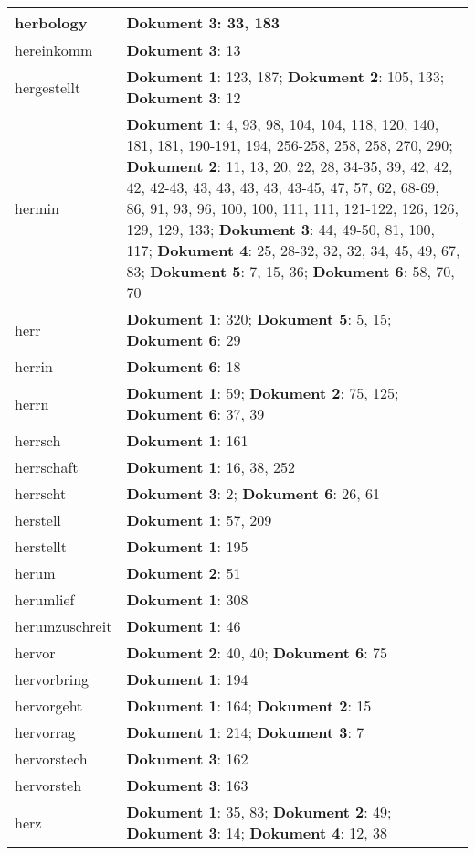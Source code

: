 \documentclass[a5paper]{article}
\begin{document}
\begin{longtable}[l]{|l|p{3in}|}
\hline
herbology & \textbf{Dokument 3}: 33, 183 \\
\hline
hereinkomm & \textbf{Dokument 3}: 13 \\
\hline
hergestellt & \textbf{Dokument 1}: 123, 187; \textbf{Dokument 2}: 105, 133; \textbf{Dokument 3}: 12 \\
\hline
hermin & \textbf{Dokument 1}: 4, 93, 98, 104, 104, 118, 120, 140, 181, 181, 190-191, 194, 256-258, 258, 258, 270, 290; \textbf{Dokument 2}: 11, 13, 20, 22, 28, 34-35, 39, 42, 42, 42, 42-43, 43, 43, 43, 43, 43-45, 47, 57, 62, 68-69, 86, 91, 93, 96, 100, 100, 111, 111, 121-122, 126, 126, 129, 129, 133; \textbf{Dokument 3}: 44, 49-50, 81, 100, 117; \textbf{Dokument 4}: 25, 28-32, 32, 32, 34, 45, 49, 67, 83; \textbf{Dokument 5}: 7, 15, 36; \textbf{Dokument 6}: 58, 70, 70 \\
\hline
herr & \textbf{Dokument 1}: 320; \textbf{Dokument 5}: 5, 15; \textbf{Dokument 6}: 29 \\
\hline
herrin & \textbf{Dokument 6}: 18 \\
\hline
herrn & \textbf{Dokument 1}: 59; \textbf{Dokument 2}: 75, 125; \textbf{Dokument 6}: 37, 39 \\
\hline
herrsch & \textbf{Dokument 1}: 161 \\
\hline
herrschaft & \textbf{Dokument 1}: 16, 38, 252 \\
\hline
herrscht & \textbf{Dokument 3}: 2; \textbf{Dokument 6}: 26, 61 \\
\hline
herstell & \textbf{Dokument 1}: 57, 209 \\
\hline
herstellt & \textbf{Dokument 1}: 195 \\
\hline
herum & \textbf{Dokument 2}: 51 \\
\hline
herumlief & \textbf{Dokument 1}: 308 \\
\hline
herumzuschreit & \textbf{Dokument 1}: 46 \\
\hline
hervor & \textbf{Dokument 2}: 40, 40; \textbf{Dokument 6}: 75 \\
\hline
hervorbring & \textbf{Dokument 1}: 194 \\
\hline
hervorgeht & \textbf{Dokument 1}: 164; \textbf{Dokument 2}: 15 \\
\hline
hervorrag & \textbf{Dokument 1}: 214; \textbf{Dokument 3}: 7 \\
\hline
hervorstech & \textbf{Dokument 3}: 162 \\
\hline
hervorsteh & \textbf{Dokument 3}: 163 \\
\hline
herz & \textbf{Dokument 1}: 35, 83; \textbf{Dokument 2}: 49; \textbf{Dokument 3}: 14; \textbf{Dokument 4}: 12, 38 \\

\end{longtable}
\end{document}

